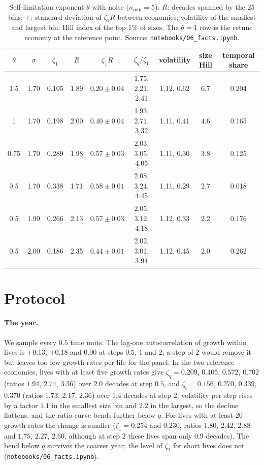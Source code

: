 \documentclass[pre,onecolumn,superscriptaddress,nofootinbib]{revtex4-2}
\begin{document}
\begin{table}[h]
\caption{Self-limitation exponent $\theta$ with noise ($n_{\min}=5$).  $R$: decades spanned by the $25$ bins;
$\pm$: standard deviation of $\zeta_1R$ between economies; volatility of the smallest and largest bin;
Hill index of the top $1\%$ of sizes.  The $\theta=1$ row is the retune economy at the reference point.
Source: \texttt{notebooks/06\_facts.ipynb}.}
\label{tab:theta}
\begin{ruledtabular}
\begin{tabular}{ccccccccc}
$\theta$ & $\sigma$ & $\zeta_1$ & $R$ & $\zeta_1R$ & $\zeta_q/\zeta_1$ & volatility & size Hill & temporal share\\
\hline
1.5 & 1.70 & 0.105 & 1.89 & $0.20\pm0.04$ & 1.75, 2.21, 2.41 & 1.12, 0.62 & 6.7 & 0.204\\
1 & 1.70 & 0.198 & 2.00 & $0.40\pm0.04$ & 1.93, 2.71, 3.32 & 1.11, 0.41 & 4.6 & 0.165\\
0.75 & 1.70 & 0.289 & 1.98 & $0.57\pm0.03$ & 2.03, 3.05, 4.05 & 1.11, 0.30 & 3.8 & 0.125\\
0.5 & 1.70 & 0.338 & 1.71 & $0.58\pm0.01$ & 2.08, 3.24, 4.45 & 1.11, 0.29 & 2.7 & 0.018\\
0.5 & 1.90 & 0.266 & 2.13 & $0.57\pm0.03$ & 2.05, 3.12, 4.18 & 1.12, 0.33 & 2.2 & 0.176\\
0.5 & 2.00 & 0.186 & 2.35 & $0.44\pm0.01$ & 2.02, 3.01, 3.94 & 1.12, 0.45 & 2.0 & 0.262\\
\end{tabular}
\end{ruledtabular}
\end{table}

\section{Protocol}
\label{sec:protocol}

\paragraph{The year.}  We sample every $0.5$ time units.  The lag-one autocorrelation of growth within
lives is $+0.13$, $+0.18$ and $0.00$ at steps $0.5$, $1$ and $2$; a step of $2$ would remove it but leaves
too few growth rates per life for the panel.  In the two reference economies, lives with at least five
growth rates give $\zeta_q=0.209$, $0.405$, $0.572$, $0.702$ (ratios $1.94$, $2.74$, $3.36$) over $2.0$
decades at step $0.5$, and $\zeta_q=0.156$, $0.270$, $0.339$, $0.370$ (ratios $1.73$, $2.17$, $2.36$) over
$1.4$ decades at step $2$: volatility per step rises by a factor $1.1$ in the smallest size bin and $2.2$
in the largest, so the decline flattens, and the ratio curve bends further below $q$.  For lives with
at least $20$ growth rates the change is smaller ($\zeta_1=0.254$ and $0.230$, ratios $1.80$, $2.42$,
$2.88$ and $1.75$, $2.27$, $2.60$, although at step $2$ these lives span only $0.9$ decades).  The bend
below $q$ survives the coarser year; the level of $\zeta_1$ for short lives does not
(\texttt{notebooks/06\_facts.ipynb}).
\end{document}
